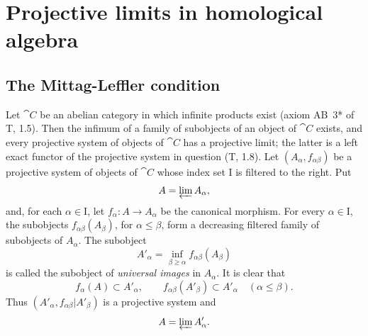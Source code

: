 \section{Projective limits in homological algebra}
\label{section:0.13}

\subsection{The Mittag-Leffler condition}
\label{subsection:0.13.1}

\begin{env}[13.1.1]
\label{0.13.1.1}
Let $\cat{C}$ be an abelian category in which infinite products exist
(axiom AB~3* of T, 1.5).
Then the infimum of a family of subobjects of an object of $\cat{C}$
exists, and every projective system of objects of $\cat{C}$ has a
projective limit; the latter is a left exact functor of the projective
system in question (T, 1.8).
Let $(A_\alpha,f_{\alpha\beta})$ be a projective system of objects of
$\cat{C}$ whose index set $\mathrm{I}$ is filtered to the right.
Put
\[
  A=\varprojlim A_\alpha,
\]
and, for each $\alpha\in\mathrm{I}$, let
$f_\alpha:A\longrightarrow A_\alpha$ be the canonical morphism.
For every $\alpha\in\mathrm{I}$, the subobjects
$f_{\alpha\beta}(A_\beta)$, for $\alpha\leq\beta$, form a decreasing
filtered family of subobjects of $A_\alpha$.
The subobject
\[
  A'_\alpha
  =
  \inf_{\beta\geq\alpha}f_{\alpha\beta}(A_\beta)
\]
is called the subobject of \emph{universal images} in $A_\alpha$.
It is clear that
\[
  f_\alpha(A)\subset A'_\alpha,
  \qquad
  f_{\alpha\beta}(A'_\beta)\subset A'_\alpha
  \quad(\alpha\leq\beta).
\]
Thus
$(A'_\alpha,f_{\alpha\beta}|A'_\beta)$ is a projective system and
\[
  A=\varprojlim A'_\alpha.
\]
\end{env}

